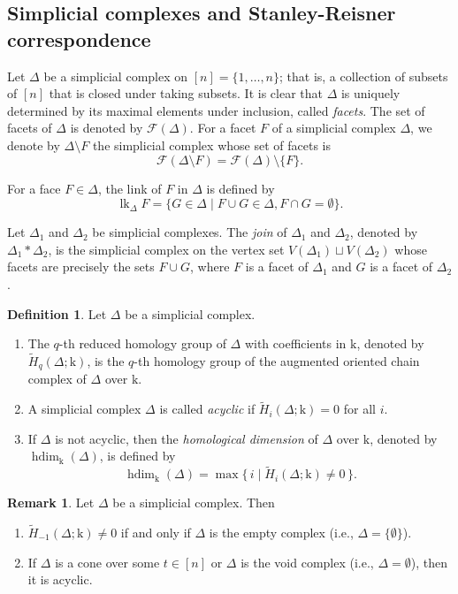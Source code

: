 \documentclass[12pt,amscd]{amsart}
\theoremstyle{definition}
\newtheorem{defn}[thm]{Definition}
\newtheorem{rem}[thm]{Remark}
\DeclareMathOperator{\hdim}{hdim}
\DeclareMathOperator{\lk}{lk}
\def\k {\mathrm k}
\def\h {\widetilde{H}}
\def\h {\widetilde{H}}
\begin{document}
\subsection{Simplicial complexes and Stanley-Reisner correspondence}
Let $\Delta$ be a simplicial complex on $[n] = \{1, \ldots, n\}$; that is, a collection of subsets of $[n]$ that is closed under taking subsets. It is clear that $\Delta$ is uniquely determined by its maximal elements under inclusion, called \emph{facets}. The set of facets of $\Delta$ is denoted by $\mathcal{F}(\Delta)$. For a facet $F$ of a simplicial complex $\Delta$, we denote by $\Delta \setminus F$ the simplicial complex whose set of facets is
\[
\mathcal{F}(\Delta \setminus F) =  \mathcal{F}(\Delta) \setminus \{F\}.
\]


For a face $F \in \Delta$, the link of $F$ in $\Delta$ is defined by 
$$ \lk_{\Delta} F = \{G \in \Delta \mid F \cup G \in \Delta, F \cap G = \emptyset \}.$$

Let $\Delta_1$ and $\Delta_2$ be simplicial complexes. The \emph{join} of $\Delta_1$ and $\Delta_2$, denoted by $\Delta_1 * \Delta_2$, is the simplicial complex on the vertex set $V(\Delta_1) \sqcup V(\Delta_2)$ whose facets are precisely the sets $F \cup G$, where $F$ is a facet of $\Delta_1$ and $G$ is a facet of $\Delta_2$.

\begin{defn}
Let $\Delta$ be a simplicial complex.
\begin{enumerate}
    \item The $q$-th reduced homology group of $\Delta$ with coefficients in $\k$, denoted by $\h_q(\Delta;\k)$, is the $q$-th homology group of the augmented oriented chain complex of $\Delta$ over $\k$.
    
    \item A simplicial complex $\Delta$ is called \emph{acyclic} if $\h_i(\Delta;\k) = 0$ for all $i$.
    
    \item If $\Delta$ is not acyclic, then the \emph{homological dimension} of $\Delta$ over $\k$, denoted by $\hdim_{\k}(\Delta)$, is defined by
    \[
    \hdim_{\k}(\Delta)
    =
    \max \{\, i \mid \h_i(\Delta;\k) \neq 0 \,\}.
    \]
\end{enumerate}
\end{defn}
\begin{rem} Let $\Delta$ be a simplicial complex. Then \begin{enumerate}
    \item $\h_{-1}(\Delta;\k) \neq 0$ if and only if $\Delta$ is the empty complex (i.e., $\Delta=\{\emptyset\}$).
    \item If $\Delta$ is a cone over some $t \in [n]$ or $\Delta$ is the void complex  (i.e., $\Delta=\emptyset$), then it is acyclic.
\end{enumerate}
\end{rem}
\end{document}
